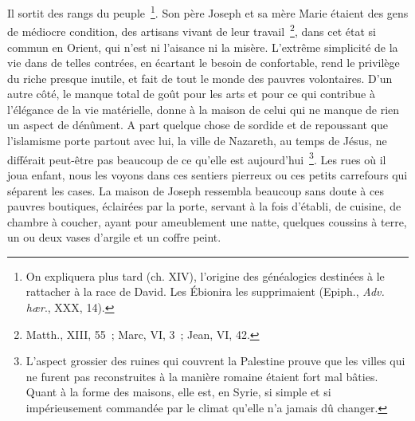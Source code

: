 \documentclass[french,twoside]{book} %
\begin{document}
Il sortit des rangs du peuple \footnote{ On expliquera plus tard (ch. XIV), l’origine des généalogies destinées à le rattacher à la race de David. Les Ébionira les supprimaient (Epiph., {\itshape Adv. hær}., XXX, 14).}. Son père Joseph et sa mère Marie étaient des gens de médiocre condition, des artisans vivant de leur travail \footnote{Matth., XIII, 55 ; Marc, VI, 3 ; Jean, VI, 42.}, dans cet état si commun en Orient, qui n’est ni l’aisance ni la misère. L’extrême simplicité de la vie dans de telles contrées, en écartant le besoin de confortable, rend le privilège du riche presque inutile, et fait de tout le monde des pauvres volontaires. D’un autre côté, le manque total de goût pour les arts et pour ce qui contribue à l’élégance de la vie matérielle, donne à la maison de celui qui ne manque de rien un aspect de dénûment. A part quelque chose de sordide et de repoussant que l’islamisme porte partout avec lui, la ville de Nazareth, au temps de Jésus, ne différait peut-être pas beaucoup de ce qu’elle est aujourd’hui \footnote{L’aspect grossier des ruines qui couvrent la Palestine prouve que les villes qui ne furent pas reconstruites à la manière romaine étaient fort mal bâties. Quant à la forme des maisons, elle est, en Syrie, si simple et si impérieusement commandée par le climat qu’elle n’a jamais dû changer.}. Les rues où il joua enfant, nous les voyons dans ces sentiers pierreux ou ces petits carrefours qui séparent les cases. La maison de Joseph ressembla beaucoup sans doute à ces pauvres boutiques, éclairées par la porte, servant à la fois d’établi, de cuisine, de chambre à coucher, ayant pour ameublement une natte, quelques coussins à terre, un ou deux vases d’argile et un coffre peint.\par
\end{document}
